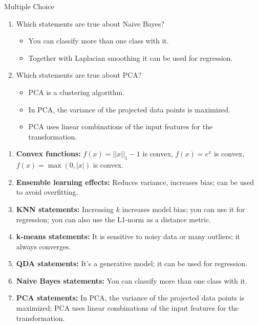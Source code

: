 \documentclass{article}
\begin{document}
\begin{exercise}{Multiple Choice}
\begin{enumerate}
    \item Which statements are true about Naive Bayes?
      \begin{itemize}
        \item You can classify more than one class with it.
        \item Together with Laplacian smoothing it can be used for regression.
      \end{itemize}
      
    \item Which statements are true about PCA?
      \begin{itemize}
        \item PCA is a clustering algorithm.
        \item In PCA, the variance of the projected data points is maximized.
        \item PCA uses linear combinations of the input features for the transformation.
      \end{itemize}
  \end{enumerate}

  \begin{solution}
    \begin{enumerate}
      \item \textbf{Convex functions:} $f(x) = ||x||_1 - 1$ is convex, $f(x) = e^x$ is convex, $f(x) = \max(0, |x|)$ is convex.
      \item \textbf{Ensemble learning effects:} Reduces variance, increases bias; can be used to avoid overfitting.
      \item \textbf{KNN statements:} Increasing $k$ increases model bias; you can use it for regression; you can also use the L1-norm as a distance metric.
      \item \textbf{k-means statements:} It is sensitive to noisy data or many outliers; it always converges.
      \item \textbf{QDA statements:} It's a generative model; it can be used for regression.
      \item \textbf{Naive Bayes statements:} You can classify more than one class with it.
      \item \textbf{PCA statements:} In PCA, the variance of the projected data points is maximized; PCA uses linear combinations of the input features for the transformation.
    \end{enumerate}
  \end{solution}
\end{exercise}
\end{document}
